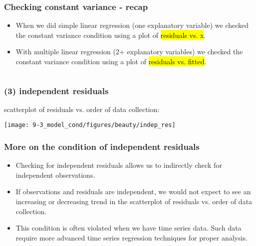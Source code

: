 
\begin{frame}
\frametitle{Checking constant variance - recap}

\begin{itemize}

\item When we did simple linear regression (one explanatory variable) we checked the constant variance condition using a plot of \hl{residuals vs. x}.

\item With multiple linear regression (2+ explanatory variables) we checked the constant variance condition using a plot of \hl{residuals vs. fitted}. 

\end{itemize}

$\:$ \\



\end{frame}


\begin{frame}[fragile]
\frametitle{(3) independent residuals}

scatterplot of residuals vs. order of data collection: \\

\begin{center}
\texttt{[image: 9-3\_model\_cond/figures/beauty/indep\_res]}
\end{center}


\end{frame}


\begin{frame}
\frametitle{More on the condition of independent residuals}

\begin{itemize}

\item Checking for independent residuals allows us to indirectly check for independent observations.

\item If observations and residuals are independent, we would not expect to see an increasing or decreasing trend in the scatterplot of residuals vs. order of data collection.

\item This condition is often violated when we have time series data. Such data require more advanced time series regression techniques for proper analysis.

\end{itemize}

\end{frame}

